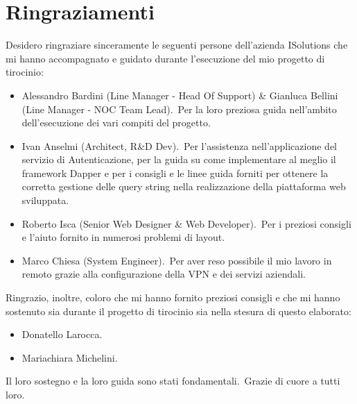 \chapter*{Ringraziamenti}
Desidero ringraziare sinceramente le seguenti persone dell'azienda ISolutions che mi hanno 
accompagnato e guidato durante l'esecuzione del mio progetto di tirocinio:
\begin{itemize}
    \item Alessandro Bardini (Line Manager \-- Head Of Support) \& Gianluca Bellini (Line Manager \-- NOC Team Lead).\ Per la loro preziosa guida nell'ambito dell'esecuzione dei vari compiti del progetto.
    \item Ivan Anselmi (Architect, R\&D Dev).\ Per l'assistenza nell'applicazione del servizio di Autenticazione, per la guida su come implementare al meglio il framework Dapper e per i consigli e le linee guida forniti per ottenere la corretta gestione delle query string nella realizzazione della piattaforma web sviluppata.
    \item Roberto Isca (Senior Web Designer \& Web Developer).\ Per i preziosi consigli e l'aiuto fornito in numerosi problemi di layout.
    \item Marco Chiesa (System Engineer).\ Per aver reso possibile il mio lavoro in remoto grazie alla configurazione della VPN e dei servizi aziendali.
\end{itemize}
%
Ringrazio, inoltre, coloro che mi hanno fornito preziosi consigli e che mi hanno sostenuto sia durante il progetto di tirocinio sia nella stesura di questo elaborato:
\begin{itemize}
    \item Donatello Larocca.
    \item Mariachiara Michelini.
\end{itemize}
%
Il loro sostegno e la loro guida sono stati fondamentali.\ Grazie di cuore a tutti loro.